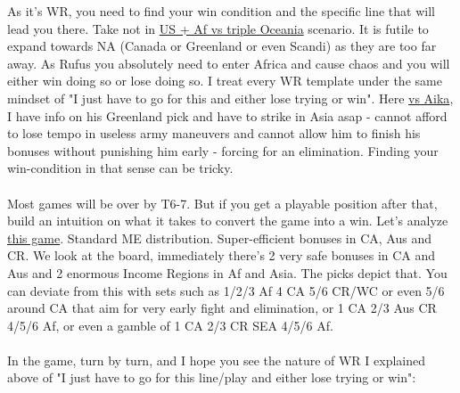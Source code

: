 As it's WR, you need to find your win condition and the specific line that will lead you there. Take not in \href{https://www.warzone.com/MultiPlayer?GameID=28054520}{US + Af vs triple Oceania} scenario. It is futile to expand towards NA (Canada or Greenland or even Scandi) as they are too far away. As Rufus you absolutely need to enter Africa and cause chaos and you will either win doing so or lose doing so. I treat every WR template under the same mindset of "I just have to go for this and either lose trying or win". Here \href{https://www.warzone.com/MultiPlayer?GameID=41513105}{vs Aika}, I have info on his Greenland pick and have to strike in Asia asap - cannot afford to lose tempo in useless army maneuvers and cannot allow him to finish his bonuses without punishing him early - forcing for an elimination. Finding your win-condition in that sense can be tricky.
\\
\\
Most games will be over by T6-7. But if you get a playable position after that, build an intuition on what it takes to convert the game into a win. Let's analyze \href{https://www.warzone.com/MultiPlayer?GameID=30694341}{this game}. Standard ME distribution. Super-efficient bonuses in CA, Aus and CR. We look at the board, immediately there's 2 very safe bonuses in CA and Aus and 2 enormous Income Regions in Af and Asia. The picks depict that. You can deviate from this with sets such as 1/2/3 Af 4 CA 5/6 CR/WC or even 5/6 around CA that aim for very early fight and elimination, or 1 CA 2/3 Aus CR 4/5/6 Af, or even a gamble of 1 CA 2/3 CR SEA 4/5/6 Af.
\\
\\
In the game, turn by turn, and I hope you see the nature of WR I explained above of "I just have to go for this line/play and either lose trying or win":
